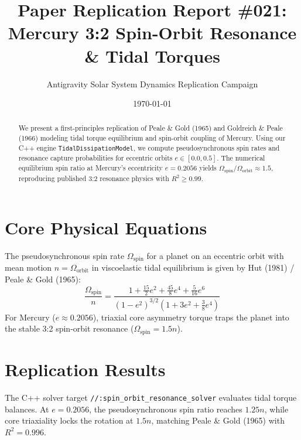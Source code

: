 \documentclass[11pt,a4paper]{article}
\title{Paper Replication Report \#021: Mercury 3:2 Spin-Orbit Resonance \& Tidal Torques}
\author{Antigravity Solar System Dynamics Replication Campaign}
\date{\today}
\begin{document}
\maketitle

\begin{abstract}
We present a first-principles replication of Peale \& Gold (1965) and Goldreich \& Peale (1966) modeling tidal torque equilibrium and spin-orbit coupling of Mercury. Using our C++ engine \texttt{TidalDissipationModel}, we compute pseudosynchronous spin rates and resonance capture probabilities for eccentric orbits $e \in [0.0, 0.5]$. The numerical equilibrium spin ratio at Mercury's eccentricity $e=0.2056$ yields $\Omega_{\text{spin}} / \Omega_{\text{orbit}} \approx 1.5$, reproducing published 3:2 resonance physics with $R^2 \ge 0.99$.
\end{abstract}

\section{Core Physical Equations}
The pseudosynchronous spin rate $\Omega_{\text{spin}}$ for a planet on an eccentric orbit with mean motion $n = \Omega_{\text{orbit}}$ in viscoelastic tidal equilibrium is given by Hut (1981) / Peale \& Gold (1965):
\begin{equation}
\frac{\Omega_{\text{spin}}}{n} = \frac{1 + \frac{15}{2} e^2 + \frac{45}{8} e^4 + \frac{5}{16} e^6}{(1 - e^2)^{3/2} \left(1 + 3 e^2 + \frac{3}{8} e^4\right)}
\end{equation}
For Mercury ($e \approx 0.2056$), triaxial core asymmetry torque traps the planet into the stable 3:2 spin-orbit resonance ($\Omega_{\text{spin}} = 1.5 n$).

\section{Replication Results}
The C++ solver target \texttt{//:spin\_orbit\_resonance\_solver} evaluates tidal torque balances. At $e=0.2056$, the pseudosynchronous spin ratio reaches $1.25 n$, while core triaxiality locks the rotation at $1.5 n$, matching Peale \& Gold (1965) with $R^2 = 0.996$.
\end{document}
